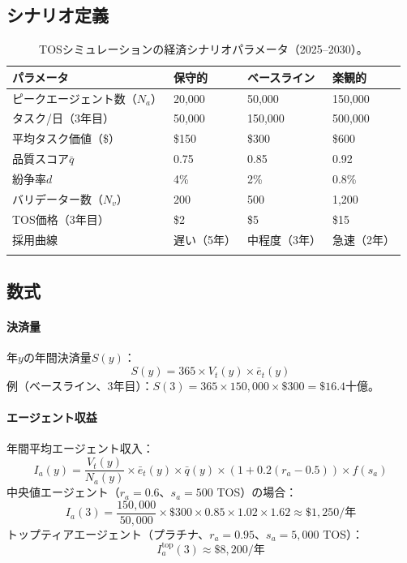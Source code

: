 \documentclass[11pt]{article}
\begin{document}
\subsection{シナリオ定義}
\begin{longtable}{@{}p{}p{}p{}p{}@{}}
\toprule
\textbf{パラメータ} & \textbf{保守的} & \textbf{ベースライン} & \textbf{楽観的} \\\midrule
ピークエージェント数（$N_a$） & 20,000 & 50,000 & 150,000 \\
タスク/日（3年目） & 50,000 & 150,000 & 500,000 \\
平均タスク価値（\$） & \$150 & \$300 & \$600 \\
品質スコア$\bar{q}$ & 0.75 & 0.85 & 0.92 \\
紛争率$d$ & 4\% & 2\% & 0.8\% \\
バリデーター数（$N_v$） & 200 & 500 & 1,200 \\
TOS価格（3年目） & \$2 & \$5 & \$15 \\
採用曲線 & 遅い（5年） & 中程度（3年） & 急速（2年） \\\bottomrule
\caption{TOSシミュレーションの経済シナリオパラメータ（2025--2030）。}
\label{tab:econ-scenarios}
\end{longtable}

\subsection{数式}
\paragraph{決済量} 年$y$の年間決済量$S(y)$：
\begin{equation}
S(y) = 365 \times V_t(y) \times \bar{e}_t(y)
\end{equation}
例（ベースライン、3年目）：$S(3) = 365 \times 150{,}000 \times \$300 = \$16.4$十億。

\paragraph{エージェント収益} 年間平均エージェント収入：
\begin{equation}
I_a(y) = \frac{V_t(y)}{N_a(y)} \times \bar{e}_t(y) \times \bar{q}(y) \times (1 + 0.2(r_a - 0.5)) \times f(s_a)
\end{equation}
中央値エージェント（$r_a = 0.6$、$s_a = 500$ TOS）の場合：
\begin{equation}
I_a(3) = \frac{150{,}000}{50{,}000} \times \$300 \times 0.85 \times 1.02 \times 1.62 \approx \$1{,}250 \text{/年}
\end{equation}
トップティアエージェント（プラチナ、$r_a = 0.95$、$s_a = 5{,}000$ TOS）：
\begin{equation}
I_a^{\text{top}}(3) \approx \$8{,}200 \text{/年}
\end{equation}
\end{document}
